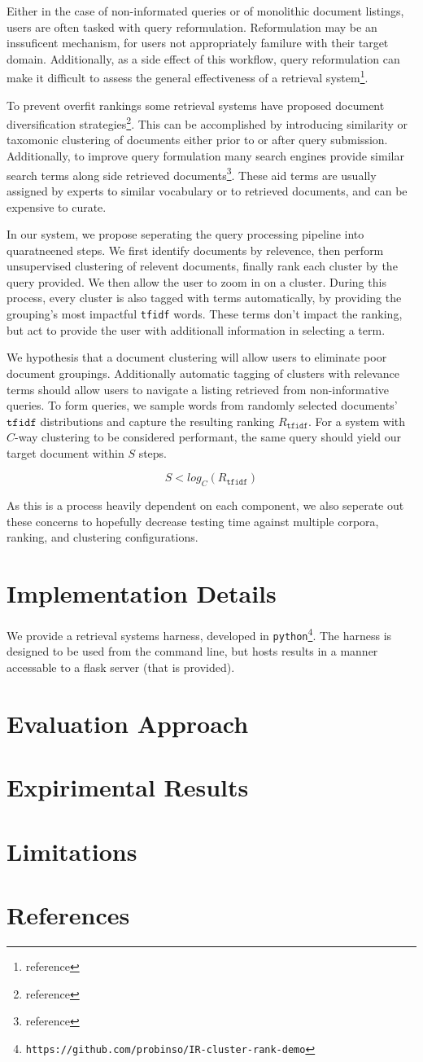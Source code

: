 \documentclass[8pt,twocolumn]{extarticle}
\def\site{\texttt{https://github.com/probinso/IR-cluster-rank-demo}\xspace}
\def\tfidf{\texttt{tfidf}\xspace}
\begin{document}
Either in the case of non-informated queries or of monolithic document listings, users
are often tasked with query reformulation. Reformulation may be an inssuficent mechanism,
for users not appropriately familure with their target domain. Additionally, as
a side effect of this workflow, query reformulation can make it difficult to assess
the general effectiveness of a retrieval system\footnote{reference}.

To prevent overfit rankings some retrieval systems have proposed document diversification
strategies\footnote{reference}. This can be accomplished by introducing similarity or
taxomonic clustering of documents either prior to or after query submission. Additionally,
to improve query formulation many search engines provide similar search terms along side
retrieved documents\footnote{reference}. These aid terms are usually assigned by experts
to similar vocabulary or to retrieved documents, and can be expensive to curate.

In our system, we propose seperating the query processing pipeline into quaratneened
steps. We first identify documents by relevence, then perform unsupervised clustering
of relevent documents, finally rank each cluster by the query provided. We then allow
the user to zoom in on a cluster. During this process, every cluster is also tagged with
terms automatically, by providing the grouping's most impactful \tfidf words. These terms
don't impact the ranking, but act to provide the user with additionall information in
selecting a term.

We hypothesis that a document clustering will allow users to eliminate poor document
groupings. Additionally automatic tagging of clusters with relevance terms should allow
users to navigate a listing retrieved from non-informative queries. To form queries, we
sample words from randomly selected documents' $\tfidf$ distributions and capture the
resulting ranking $R_\tfidf$. For a system with $C$-way clustering to be considered
performant, the same query should yield our target document within $S$ steps.

\[S < log_C (R_\tfidf)\]

As this is a process heavily dependent on each component, we also seperate out these
concerns to hopefully decrease testing time against multiple corpora, ranking, and
clustering configurations.

\def\python{\texttt{python}\xspace}
\section{Implementation Details}
We provide a retrieval systems harness, developed in \python\footnote{\site}. The
harness is designed to be used from the command line, but hosts results in a manner
accessable to a flask server (that is provided).


\section{Evaluation Approach}
\section{Expirimental Results}
\section{Limitations}
\section{References}
\end{document}
